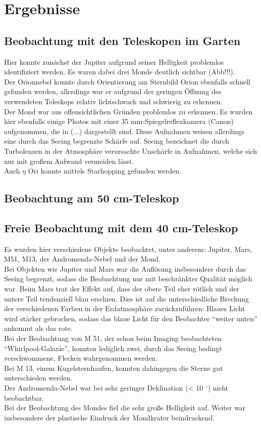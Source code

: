 \section{Ergebnisse}
\subsection{Beobachtung mit den Teleskopen im Garten}
Hier konnte zunächst der Jupiter aufgrund seiner Helligkeit problemlos identifiziert werden. Es waren dabei drei Monde deutlich sichtbar (Abb!!!). \\
Der Orionnebel konnte durch Orientierung am Sternbild Orion ebenfalls schnell gefunden werden, allerdings war er aufgrund der geringen Öffnung des verwendeten Teleskops relativ lichtschwach und schwierig zu erkennen. \\
Der Mond war aus offensichtlichen Gründen problemlos zu erkennen. Es wurden hier ebenfalls einige Photos mit einer 35 mm-Spiegelreflexkamera (Canon) aufgenommen, die in (...) dargestellt sind. Diese Aufnahmen weisen allerdings eine durch das Seeing begrenzte Schärfe auf. Seeing bezeichnet die durch Turbolenzen in der Atmosphäre verursachte Unschärfe in Aufnahmen, welche sich nur mit großem Aufwand vermeiden lässt. \\
Auch $\eta$ Ori konnte mittels Starhopping gefunden werden.

\subsection{Beobachtung am 50 cm-Teleskop} 

\subsection{Freie Beobachtung mit dem 40 cm-Teleskop}
Es wurden hier verschiedene Objekte beobachtet, unter anderem: Jupiter, Mars, M51, M13, der Andromenda-Nebel und der Mond. \\
Bei Objekten wie Jupiter und Mars war die Auflösung insbesondere durch das Seeing begrenzt, sodass die Beobachtung nur mit beschränkter Qualität möglich war. Beim Mars trat der Effekt auf, dass der obere Teil eher rötlich und der untere Teil tendenziell blau erschien. Dies ist auf die unterschiedliche Brechung der verschiedenen Farben in der Erdatmosphäre zurückzuführen: Blaues Licht wird stärker gebrochen, sodass das blaue Licht für den Beobachter \enquote{weiter unten} ankommt als das rote. \\
Bei der Beobachtung von M 51, der schon beim Imaging beobachteten \enquote{Whirlpool-Galaxie}, konnten lediglich zwei, durch das Seeing bedingt verschwommene, Flecken wahrgenommen werden. \\
Bei M 13, einem Kugelsternhaufen, konnten dahingegen die Sterne gut unterschieden werden. \\
Der Andromenda-Nebel war bei sehr geringer Deklination (< 10 $^\circ$) nicht beobachtbar. \\
Bei der Beobachtung des Mondes fiel die sehr große Helligkeit auf. Weiter war insbesondere der plastische Eindruck der Mondkrater beindruckend. 